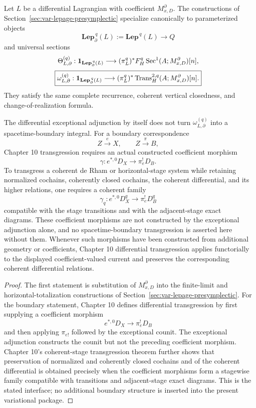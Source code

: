 \begin{proposition}
\label{prop:var-differential-lepage-specialization}
Let \(L\) be a differential Lagrangian with coefficient \(M^\partial_{x,D}\).  The constructions of Section~\ref{sec:var-lepage-presymplectic} specialize canonically to parameterized objects
\[
    \mathbf{Lep}^{\,q}_\partial(L)
    :=
    \mathbf{Lep}^{\,q}(L)
    \longrightarrow Q
\]
and universal sections
\[
    \Theta_{L,\partial}^{(q)}:
    \mathbf 1_{\mathbf{Lep}^{\,q}_\partial(L)}
    \longrightarrow
    (\pi_L^q)^*
    F_H^q\operatorname{Sec}^1(A;M^\partial_{x,D})[n],
\]
\[
    \boxed{
    \omega_{L,\partial}^{(q)}:
    \mathbf 1_{\mathbf{Lep}^{\,q}_\partial(L)}
    \longrightarrow
    (\pi_L^q)^*
    \operatorname{Trans}_{H}^{2,q}(A;M^\partial_{x,D})[n].
    }
\]
They satisfy the same complete recurrence, coherent vertical closedness, and change-of-realization formula.

The differential exceptional adjunction by itself does not turn \(\omega_{L,\partial}^{(q)}\) into a spacetime-boundary integral.  For a boundary correspondence
\[
    Z\xrightarrow{e}X,
    \qquad
    Z\xrightarrow{\pi}B,
\]
Chapter 10 transgression requires an actual constructed coefficient morphism
\[
    \gamma:e^{*,0}D_X\longrightarrow\pi_e^!D_B.
\]
To transgress a coherent de Rham or horizontal-stage system while retaining normalized cochains, coherently closed cochains, the coherent differential, and its higher relations, one requires a coherent family
\[
    \gamma_q:
    e^{*,0}D_X^q
    \longrightarrow
    \pi_e^!D_B^q
\]
compatible with the stage transitions and with the adjacent-stage exact diagrams.  These coefficient morphisms are not constructed by the exceptional adjunction alone, and no spacetime-boundary transgression is asserted here without them.  Whenever such morphisms have been constructed from additional geometry or coefficients, Chapter 10 differential transgression applies functorially to the displayed coefficient-valued current and preserves the corresponding coherent differential relations.
\end{proposition}

\begin{proof}
The first statement is substitution of \(M^\partial_{x,D}\) into the finite-limit and horizontal-totalization constructions of Section~\ref{sec:var-lepage-presymplectic}.  For the boundary statement, Chapter 10 defines differential transgression by first supplying a coefficient morphism
\[
    e^{*,0}D_X\longrightarrow\pi_e^!D_B
\]
and then applying \(\pi_{e!}\) followed by the exceptional counit.  The exceptional adjunction constructs the counit but not the preceding coefficient morphism.  Chapter 10's coherent-stage transgression theorem further shows that preservation of normalized and coherently closed cochains and of the coherent differential is obtained precisely when the coefficient morphisms form a stagewise family compatible with transitions and adjacent-stage exact diagrams.  This is the stated interface; no additional boundary structure is inserted into the present variational package.
\end{proof}

